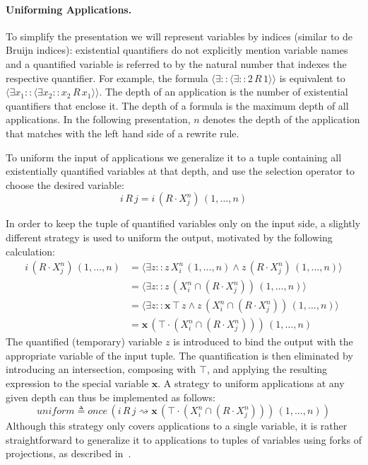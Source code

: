 \documentclass{llncs}
\begin{document}
\paragraph{Uniforming Applications.} To simplify the presentation we
will represent variables by indices (similar to de Bruijn indices):
existential quantifiers do not explicitly mention variable names and a
quantified variable is referred to by the natural number that indexes the
respective quantifier. For example, the formula $\langle \exists ::
\langle \exists :: 2\, R\, 1 \rangle \rangle$ is equivalent to
$\langle \exists x_1 :: \langle \exists x_2 :: x_2 \, R \, x_1 \rangle
\rangle$. The depth of an application is the number of existential
quantifiers that enclose it. The depth of a formula is the maximum
depth of all applications. In the following presentation, $n$ denotes
the depth of the application that matches with the left hand side of
a rewrite rule.

To uniform the input of applications we generalize it to a tuple
containing all existentially quantified variables at that depth, and
use the selection operator to choose the desired variable:
\begin{equation*}
i \, R \, j = i \, (R \cdot X^n_j) \, (1, \dots, n)
\end{equation*}

In order to keep the tuple of quantified variables only on the input
side, a slightly different strategy is used to uniform the output,
motivated by the following calculation:
\begin{align*}
  i\, (R \cdot X^n_j) \, (1, \dots, n) & = \langle \exists z :: z \, X^n_i \, (1, \dots, n) \wedge z \, (R \cdot X^n_j) \, (1, \dots, n) \rangle\\
  & = \langle \exists z :: z \, (X^n_i \cap (R \cdot X^n_j)) \, (1, \dots, n) \rangle\\
  & = \langle \exists z :: \mathbf{x} \, \top \, z \wedge z \, (X^n_i \cap (R \cdot X^n_j)) \, (1, \dots, n) \rangle\\
  & = \mathbf{x} \, (\top \cdot (X^n_i \cap (R \cdot X^n_j))) \, (1, \dots, n)
\end{align*}
The quantified (temporary) variable $z$ is introduced to bind the
output with the appropriate variable of the input tuple. The
quantification is then eliminated by introducing an intersection,
composing with $\top$, and applying the resulting expression to the
special variable $\mathbf{x}$. A strategy to uniform applications at
any given depth can thus be implemented as follows:
\begin{equation*}
\mathit{uniform} \triangleq \mathit{once} \, (i \, R \, j \rightsquigarrow \mathbf{x} \, (\top \cdot (X^n_i \cap (R \cdot X^n_j))) \, (1, \dots, n))
\end{equation*}
Although this strategy only covers applications to a single variable,
it is rather straightforward to generalize it to applications to tuples of
variables using forks of projections, as described in~\cite{allpf}. 
\end{document}
